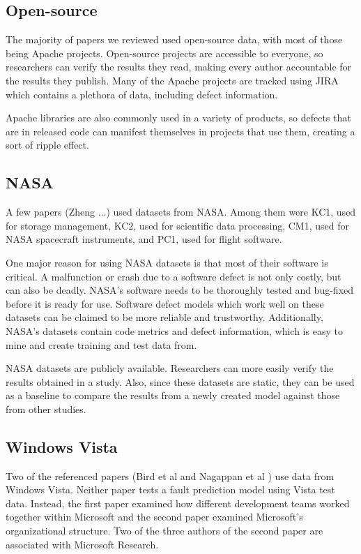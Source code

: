 \documentclass{sig-alternate-05-2015}
\begin{document}
\subsection{Open-source}
The majority of papers we reviewed used open-source data, with most of those being Apache projects. Open-source projects are accessible to everyone, so researchers can verify the results they read, making every author accountable for the results they publish. Many of the Apache projects are tracked using JIRA which contains a plethora of data, including defect information.

Apache libraries are also commonly used in a variety of products, so defects that are in released code can manifest themselves in projects that use them, creating a sort of ripple effect.

\subsection{NASA}
A few papers (Zheng \cite{zheng2010}...) used datasets from NASA. Among them were KC1, used for storage management, KC2, used for scientific data processing, CM1, used for NASA spacecraft instruments, and PC1, used for flight software.

One major reason for using NASA datasets is that most of their software is critical. A malfunction or crash due to a software defect is not only costly, but can also be deadly. NASA's software needs to be thoroughly tested and bug-fixed before it is ready for use. Software defect models which work well on these datasets can be claimed to be more reliable and trustworthy. Additionally, NASA's datasets contain code metrics and defect information, which is easy to mine and create training and test data from.

NASA datasets are publicly available. Researchers can more easily verify the results obtained in a study. Also, since these datasets are static, they can be used as a baseline to compare the results from a newly created model against those from other studies.
\subsection{Windows Vista}
Two of the referenced papers (Bird et al \cite{Bird} and Nagappan et al \cite{Nagappan}) use data from Windows Vista. Neither paper tests a fault prediction model using Vista test data. Instead, the first paper examined how different development teams worked together within Microsoft and the second paper examined Microsoft's organizational structure. Two of the three authors of the second paper are associated with Microsoft Research. 
\end{document}
